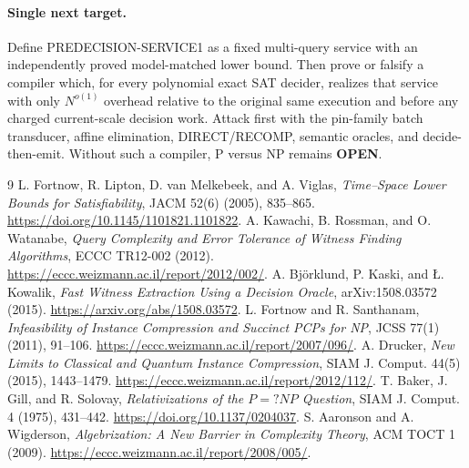\documentclass[11pt]{article}
\begin{document}
\paragraph{Single next target.}
Define \textsf{PREDECISION-SERVICE1} as a fixed multi-query service with an
independently proved model-matched lower bound.  Then prove or falsify a
compiler which, for every polynomial exact SAT decider, realizes that service
with only $N^{o(1)}$ overhead relative to the original same execution and
before any charged current-scale decision work.  Attack first with the
pin-family batch transducer, affine elimination, DIRECT/RECOMP, semantic
oracles, and decide-then-emit.  Without such a compiler, P versus NP remains
\textbf{OPEN}.

\begin{thebibliography}{9}
 L. Fortnow, R. Lipton, D. van Melkebeek, and A. Viglas,
\emph{Time--Space Lower Bounds for Satisfiability}, JACM 52(6) (2005),
835--865. \url{https://doi.org/10.1145/1101821.1101822}.
 A. Kawachi, B. Rossman, and O. Watanabe,
\emph{Query Complexity and Error Tolerance of Witness Finding Algorithms},
ECCC TR12-002 (2012). \url{https://eccc.weizmann.ac.il/report/2012/002/}.
 A. Bj\"orklund, P. Kaski, and \L. Kowalik,
\emph{Fast Witness Extraction Using a Decision Oracle}, arXiv:1508.03572
(2015). \url{https://arxiv.org/abs/1508.03572}.
 L. Fortnow and R. Santhanam,
\emph{Infeasibility of Instance Compression and Succinct PCPs for NP},
JCSS 77(1) (2011), 91--106.
\url{https://eccc.weizmann.ac.il/report/2007/096/}.
 A. Drucker,
\emph{New Limits to Classical and Quantum Instance Compression}, SIAM J.
Comput. 44(5) (2015), 1443--1479.
\url{https://eccc.weizmann.ac.il/report/2012/112/}.
 T. Baker, J. Gill, and R. Solovay,
\emph{Relativizations of the $P=?NP$ Question}, SIAM J. Comput. 4 (1975),
431--442. \url{https://doi.org/10.1137/0204037}.
 S. Aaronson and A. Wigderson,
\emph{Algebrization: A New Barrier in Complexity Theory}, ACM TOCT 1 (2009).
\url{https://eccc.weizmann.ac.il/report/2008/005/}.
\end{thebibliography}

\end{document}
